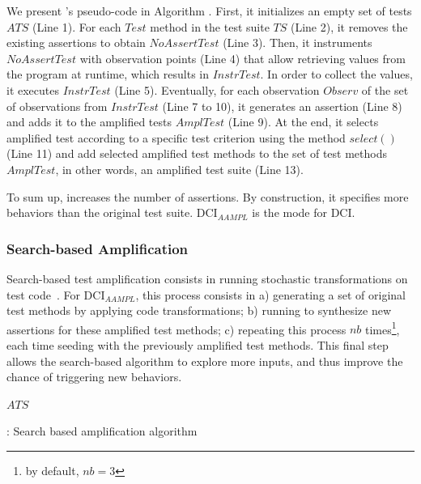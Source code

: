We present \aampl's pseudo-code in Algorithm . First, it initializes an empty set of tests $ATS$ (Line 1). 
For each $Test$ method in the test suite $TS$ (Line 2), it removes the existing assertions to obtain $NoAssertTest$ (Line 3). 
Then, it instruments $NoAssertTest$ with observation points (Line 4) that allow retrieving values from the program at runtime, which results in $InstrTest$. 
In order to collect the values, it executes $InstrTest$ (Line 5).
Eventually, for each observation $Observ$ of the set of observations from $InstrTest$ (Line 7 to 10), it generates an assertion (Line 8) and adds it to the amplified tests $AmplTest$ (Line 9).
At the end, it selects amplified test according to a specific test criterion using the method $select()$ (Line 11) and add selected amplified test methods to the set of test methods $AmplTest$, in other words, an amplified test suite (Line 13).

To sum up, \aampl increases the number of assertions. 
By construction, it specifies more behaviors than the original test suite.
DCI$_{AAMPL}$ is the \aampl mode for DCI.

%
%
\subsubsection{Search-based Amplification}
\label{subsec:sbampl}
Search-based test amplification consists in running stochastic transformations on test code~\cite{tonella}.
%
For DCI$_{AAMPL}$, this process consists in
a) generating a set of original test methods by applying code transformations;
b) running \aampl to synthesize new assertions for these amplified test methods;
c) repeating this process $nb$ times\footnote{by default, $nb=3$}, each time seeding with the previously amplified test methods.
%
This final step allows the search-based algorithm to explore more inputs, and thus improve the chance of triggering new behaviors.

\begin{algorithm}[h]
\begin{algorithmic}[1]
    \EndFor
\EndFor
\Return $ATS$
\end{algorithmic}
\caption{\sbampl: Search based amplification algorithm}
\label{algo:sbampl}
\end{algorithm}


